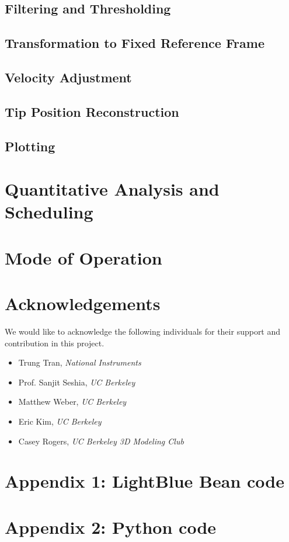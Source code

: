 \documentclass[12pt,journal]{IEEEtran}
\begin{document}
\subsection{Filtering and Thresholding}
\subsection{Transformation to Fixed Reference Frame}
\subsection{Velocity Adjustment}
\subsection{Tip Position Reconstruction}
\subsection{Plotting}

\section{Quantitative Analysis and Scheduling}

\section{Mode of Operation}

\section{Acknowledgements}
We would like to acknowledge the following individuals for their support and contribution in this project.
\begin{itemize}
\item Trung Tran, \textit{National Instruments}
\item Prof. Sanjit Seshia, \textit{UC Berkeley}
\item Matthew Weber, \textit{UC Berkeley}
\item Eric Kim, \textit{UC Berkeley}
\item Casey Rogers, \textit{UC Berkeley 3D Modeling Club}
\end{itemize}

\newpage
\onecolumn

\section{Appendix 1: LightBlue Bean code}
\small{

}

\section{Appendix 2: Python code}
\small{

}
\end{document}

